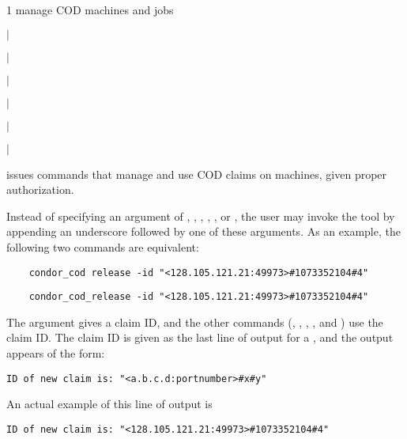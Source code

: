 \begin{ManPage}{\label{man-condor-cod}}{1}
{manage COD machines and jobs}

\Synopsis
{}
\ToolArgsBase

\ToolLocate
\Lbr {} $|$  \Rbr
{}

 
\Lbr {} $|$  \Rbr
{}

 
\Lbr {} $|$  \Rbr
{}

 
\Lbr {} $|$  \Rbr
{}

 
\Lbr {} $|$  \Rbr

 
\Lbr {} $|$  \Rbr


\Description

 issues commands that manage and use COD claims on
machines, given proper authorization.

Instead of specifying an argument of
, , , , ,
or ,
the user may invoke the  tool by appending an
underscore followed by one of these arguments.
As an example, the following two commands are equivalent:
\begin{verbatim}
    condor_cod release -id "<128.105.121.21:49973>#1073352104#4"
\end{verbatim}
\begin{verbatim}
    condor_cod_release -id "<128.105.121.21:49973>#1073352104#4"
\end{verbatim}

The  argument gives a claim ID, and the other 
commands (, , , ,
and ) use the claim ID.
The claim ID is given as the last line of output for a ,
and the output appears of the form:
\footnotesize
\begin{verbatim}
ID of new claim is: "<a.b.c.d:portnumber>#x#y"
\end{verbatim}
\normalsize
An actual example of this line of output is 
\footnotesize
\begin{verbatim}
ID of new claim is: "<128.105.121.21:49973>#1073352104#4"
\end{verbatim}
\normalsize


\end{ManPage}
